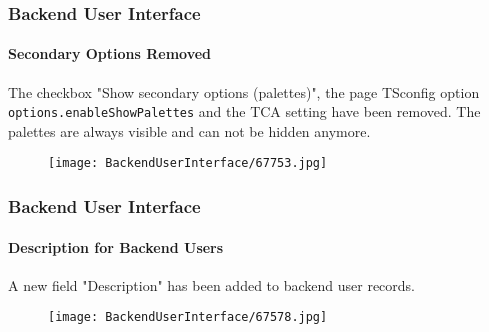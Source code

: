 \begin{frame}[fragile]
	\frametitle{Backend User Interface}
	\framesubtitle{Secondary Options Removed}

	The checkbox "Show secondary options (palettes)", the page TSconfig option \texttt{options.enableShowPalettes}
	and the TCA setting have been removed. The palettes are always visible and can not be hidden anymore.

	\begin{figure}
		\texttt{[image: BackendUserInterface/67753.jpg]}
	\end{figure}

\end{frame}

\begin{frame}[fragile]
	\frametitle{Backend User Interface}
	\framesubtitle{Description for Backend Users}

	A new field "Description" has been added to backend user records.

	\begin{figure}
		\texttt{[image: BackendUserInterface/67578.jpg]}
	\end{figure}

\end{frame}

